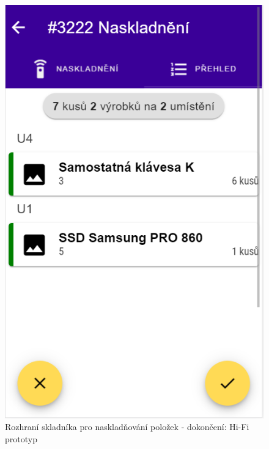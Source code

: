 \begin{figure}[h]
\includegraphics[height=0.5\textheight]{../png/hifi/dokonceni.png}
\caption{Rozhraní skladníka pro naskladňování položek - dokončení: Hi-Fi prototyp} \label{picture:hifi:dokonceni}
\end{figure}

